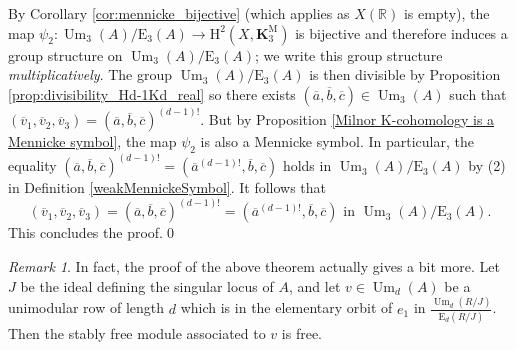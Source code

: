 \documentclass[11pt,leqno]{amsart}
\newcommand{\Spec}{\operatorname{Spec}}
\renewcommand{\1}{{\rm 1\hspace*{-0.4ex}%
\rule{0.1ex}{1.52ex}\hspace*{0.2ex}}}
\newcommand{\K}{{{\mathbf K}}}
\newcommand{\KM}{\K^{\mathrm M}}
\newcommand{\Hr}{{\mathrm {H}}}
\newcommand{\<}[1]{{\langle}#1 {\rangle}}
\newcommand{\Rb}{\mathbb{R}}
\newcommand{\Kbf}{\mathbf{K}}
\newcommand{\Er}{\mathrm{E}}
\newcommand{\Mr}{\mathrm{M}}
\newcommand{\Um}{\operatorname{Um}}
\theoremstyle{plain}
\theoremstyle{definition}
\theoremstyle{remark}
\newtheorem{rem}[thm]{Remark}
\numberwithin{equation}{section}
\begin{document}
By Corollary \ref{cor:mennicke_bijective} (which applies as $X(\Rb)$ is empty), the map $\psi_2:\Um_3(A)/\Er_3(A)\to\Hr^2(X,\Kbf_3^\Mr)$ is bijective and therefore induces a group structure on $\Um_3(A)/\Er_3(A)$; we write this group structure \emph{multiplicatively}. The group $\Um_3(A)/\Er_3(A)$ is then divisible by Proposition \ref{prop:divisibility_Hd-1Kd_real} so there exists $(\overline{a}, \overline{b}, \overline{c})\in\Um_3(A)$ such that $(\overline{v}_1, \overline{v}_2, \overline{v}_3)=(\overline{a}, \overline{b}, \overline{c})^{(d-1)!}$. But by Proposition \ref{Milnor K-cohomology is a Mennicke symbol}, the map $\psi_2$ is also a Mennicke symbol. In particular, the equality $(\overline{a}, \overline{b}, \overline{c})^{(d-1)!}=(\overline{a}^{(d-1)!}, \overline{b}, \overline{c})$ holds in $\Um_3(A)/\Er_3(A)$ by (2) in Definition \ref{weakMennickeSymbol}. It follows that \[(\overline{v}_1, \overline{v}_2, \overline{v}_3) =(\overline{a}, \overline{b}, \overline{c})^{(d-1)!} =(\overline{a}^{(d-1)!}, \overline{b}, \overline{c})\text{ in } \Um_3(A)/\mathrm{E}_3(A).\]
This concludes the proof.\qed





\begin{rem}\label{Fasel'sRemark} In fact, the proof of the above theorem actually gives a bit more. Let $J$ be the ideal defining the singular locus of $A$, and let $v\in \Um_d(A)$ be a
	unimodular row of length $d$ which is in the elementary orbit of $e_1$ in $\frac{\Um_d (R/J)}{\mathrm{E}_d (R/J)}$. Then the stably free module associated to $v$ is free.
	
\end{rem} 
\end{document}
